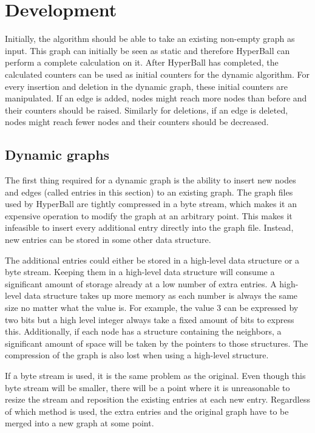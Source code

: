 \chapter{Development}
Initially, the algorithm should be able to take an existing non-empty graph as input. This graph can initially be seen as static and therefore HyperBall can perform a complete calculation on it. After HyperBall has completed, the calculated counters can be used as initial counters for the dynamic algorithm. For every insertion and deletion in the dynamic graph, these initial counters are manipulated. If an edge is added, nodes might reach more nodes than before and their counters should be raised. Similarly for deletions, if an edge is deleted, nodes might reach fewer nodes and their counters should be decreased.


\section{Dynamic graphs}

The first thing required for a dynamic graph is the ability to insert new nodes and edges (called entries in this section) to an existing graph. The graph files used by HyperBall are tightly compressed in a byte stream, which makes it an expensive operation to modify the graph at an arbitrary point. This makes it infeasible to insert every additional entry directly into the graph file. Instead, new entries can be stored in some other data structure.

The additional entries could either be stored in a high-level data structure or a byte stream. Keeping them in a high-level data structure will consume a significant amount of storage already at a low number of extra entries. A high-level data structure takes up more memory as each number is always the same size no matter what the value is. For example, the value 3 can be expressed by two bits but a high level integer always take a fixed amount of bits to express this.  Additionally, if each node has a structure containing the neighbors, a significant amount of space will be taken by the pointers to those structures. The compression of the graph is also lost when using a high-level structure.

If a byte stream is used, it is the same problem as the original. Even though this byte stream will be smaller, there will be a point where it is unreasonable to resize the stream and reposition the existing entries at each new entry. Regardless of which method is used, the extra entries and the original graph have to be merged into a new graph at some point. 

